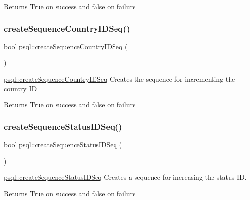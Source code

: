 \begin{DoxyReturn}{Returns}
True on success and false on failure 
\end{DoxyReturn}
\mbox{\label{classpsql_aa907c84f592212451d3d59a2061adabd}} 
\subsubsection{\texorpdfstring{create\+Sequence\+Country\+I\+D\+Seq()}{createSequenceCountryIDSeq()}}
{\footnotesize\ttfamily bool psql\+::create\+Sequence\+Country\+I\+D\+Seq (\begin{DoxyParamCaption}{ }\end{DoxyParamCaption})}



\hyperlink{classpsql_aa907c84f592212451d3d59a2061adabd}{psql\+::create\+Sequence\+Country\+I\+D\+Seq} Creates the sequence for incrementing the country ID 

\begin{DoxyReturn}{Returns}
True on success and false on failure 
\end{DoxyReturn}
\mbox{\label{classpsql_ae882aa80b2d629383fc2e60aecfd421a}} 
\subsubsection{\texorpdfstring{create\+Sequence\+Status\+I\+D\+Seq()}{createSequenceStatusIDSeq()}}
{\footnotesize\ttfamily bool psql\+::create\+Sequence\+Status\+I\+D\+Seq (\begin{DoxyParamCaption}{ }\end{DoxyParamCaption})}



\hyperlink{classpsql_ae882aa80b2d629383fc2e60aecfd421a}{psql\+::create\+Sequence\+Status\+I\+D\+Seq} Creates a sequence for increasing the status ID. 

\begin{DoxyReturn}{Returns}
True on success and false on failure 
\end{DoxyReturn}
\mbox{\label{classpsql_a6ce21cb5a1e77cb0c280e2932d2b557d}} 
